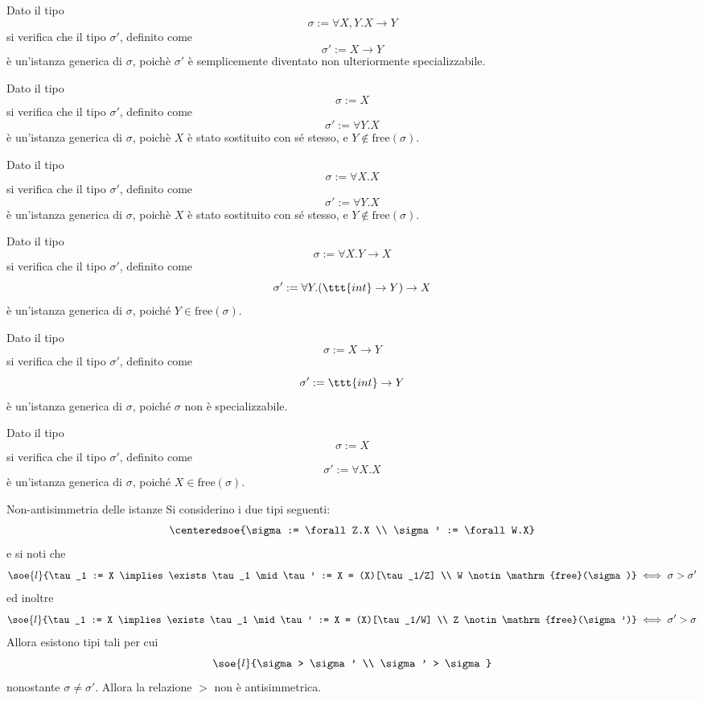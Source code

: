 \documentclass[a4paper, 12pt]{report}
\begin{document}
    \begin{example}
        Dato il tipo $$\sigma := \forall X,Y.X \to Y$$ si verifica che il tipo $\sigma'$, definito come $$\sigma' := X \to Y$$ è un'istanza generica di $\sigma$, poichè $\sigma'$ è semplicemente diventato non ulteriormente specializzabile.
    \end{example}

    \begin{example}
        Dato il tipo $$\sigma := X$$ si verifica che il tipo $\sigma'$, definito come $$\sigma' := \forall Y.X$$ è un'istanza generica di $\sigma$, poichè $X$ è stato sostituito con sé stesso, e $Y \notin \mathrm{free}(\sigma)$.
    \end{example}

    \begin{example}
        Dato il tipo $$\sigma := \forall X.X$$ si verifica che il tipo $\sigma'$, definito come $$\sigma' := \forall Y.X$$ è un'istanza generica di $\sigma$, poichè $X$ è stato sostituito con sé stesso, e $Y \notin \mathrm{free}(\sigma)$.
    \end{example}

    \begin{nonexample}
        Dato il tipo $$\sigma := \forall X.Y \to X$$ si verifica che il tipo $\sigma'$, definito come $$\sigma' := \forall Y.(\ttt{int} \to Y) \to X$$  è un'istanza generica di $\sigma$, poiché $Y \in \mathrm{free}(\sigma)$.
    \end{nonexample}

    \begin{nonexample}
        Dato il tipo $$\sigma := X \to Y$$ si verifica che il tipo $\sigma'$, definito come $$\sigma' := \ttt{int} \to Y$$  è un'istanza generica di $\sigma$, poiché $\sigma$ non è specializzabile.
    \end{nonexample}

    \begin{nonexample}
        Dato il tipo $$\sigma := X$$ si verifica che il tipo $\sigma'$, definito come $$\sigma' := \forall X.X$$  è un'istanza generica di $\sigma$, poiché $X \in \mathrm{free}(\sigma)$.
    \end{nonexample}

    \begin{framedobs}{Non-antisimmetria delle istanze}
        Si considerino i due tipi seguenti: $$\centeredsoe{\sigma := \forall Z.X \\ \sigma' := \forall W.X}$$ e si noti che $$\soe{l}{\tau_1 := X \implies \exists \tau_1 \mid \tau' := X = (X)[\tau_1/Z] \\ W \notin \mathrm{free}(\sigma)} \iff \sigma > \sigma'$$ ed inoltre $$\soe{l}{\tau_1 := X \implies \exists \tau_1 \mid \tau' := X = (X)[\tau_1/W] \\ Z \notin \mathrm{free}(\sigma')} \iff \sigma' > \sigma$$ Allora esistono tipi tali per cui $$\soe{l}{\sigma > \sigma ' \\ \sigma' > \sigma}$$ nonostante $\sigma \neq \sigma'$. Allora la relazione $>$ non è antisimmetrica.
    \end{framedobs}
\end{document}
